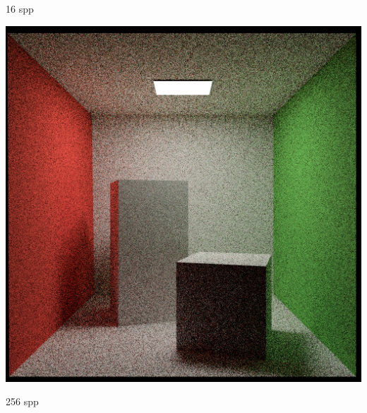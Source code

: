 \documentclass[utf8,stillsansserifmath,fleqn,t]{beamer}
\begin{document}
\begin{frame}
\begin{minipage}[t]{.33\textwidth}
\centerline{16 spp}
\end{minipage}\hfill
\begin{minipage}[t]{.33\textwidth}
\includegraphics[width=\textwidth]{./fig/cornellbox-bruteforce-256spp.png}
\centerline{256 spp}
\end{minipage}
\end{frame}
\end{document}
